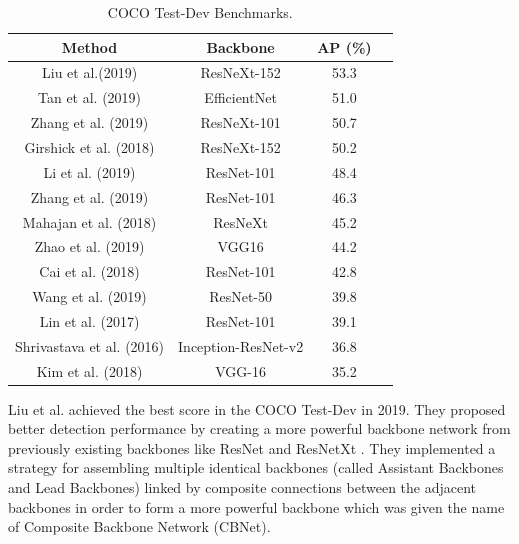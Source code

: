 \begin{table}[htb]
    
    \centering
    \caption {COCO Test-Dev Benchmarks.}
    \begin{tabular}{|| c | c | c | c ||} 
    \hline
    Method & Backbone & AP (\%)  \\ [0.5ex] 
    \hline\hline
    Liu et al.(2019) \cite{Liu2019}  & ResNeXt-152 & 53.3 \\ 
    \hline
    Tan et al. (2019) \cite{Tan2019} & EfficientNet & 51.0 \\
    \hline
    Zhang et al. (2019) \cite{Zhang2019} & ResNeXt-101 & 50.7
    \\
    \hline
    Girshick et al. (2018) \cite{Detectron2018} & ResNeXt-152 & 50.2
    \\
    \hline
    Li et al. (2019) \cite{Li2019} & ResNet-101 & 48.4
    \\ [1ex] 
    \hline
    Zhang et al. (2019) \cite{Zhang2019} & ResNet-101  & 46.3
    \\ [1ex]
    \hline
    Mahajan et al. (2018) \cite{Mahajan2018} & ResNeXt & 45.2
    \\ [1ex]
    \hline
    Zhao et al. (2019) \cite{Zhao2019} & VGG16 & 44.2
    \\ [1ex]
    \hline
    Cai et al. (2018) \cite{Cai2018} & ResNet-101 & 42.8
    \\ [1ex]
    \hline
    Wang et al. (2019) \cite{Wang2019} & ResNet-50    & 39.8
    \\ [1ex]
    \hline
    Lin et al. (2017) \cite{Lin2017} & ResNet-101 & 39.1
    \\ [1ex]
    \hline
    Shrivastava et al. (2016) \cite{shrivastava2016skip} & Inception-ResNet-v2 & 36.8
    \\ [1ex]
    \hline
    Kim et al. (2018) \cite{Kim2018} & VGG-16 & 35.2
    \\ [1ex]
    \hline
   \end{tabular}
   \label{table:cocotable}
\end{table}

\par Liu et al. \cite{Liu2019} achieved the best score in the COCO Test-Dev in 2019. They proposed better detection performance by creating a more powerful backbone network from previously existing backbones like ResNet \cite{He2016} and ResNetXt \cite{Xie2017}. They implemented a strategy for assembling multiple identical backbones (called Assistant Backbones and Lead Backbones) linked by composite connections between the adjacent backbones in order to form a more powerful backbone which was given the name of Composite Backbone Network (CBNet).

